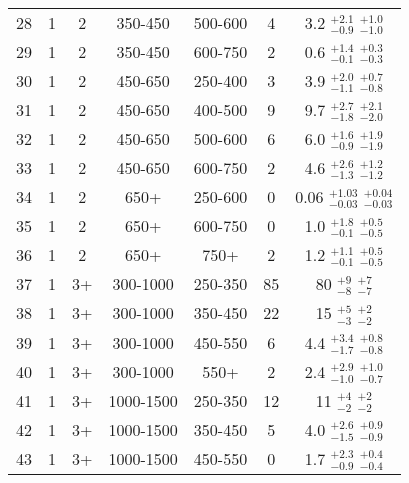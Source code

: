 \begin{table}[tbp]
{\begin{tabular}{ccccc  cc}
        28 &          1 &          2 &    350-450 &    500-600 &          4 &   3.2 $^{ +2.1} _{ -0.9}$ $^{ +1.0} _{ -1.0}$ \\
        29 &          1 &          2 &    350-450 &    600-750 &          2 &   0.6 $^{ +1.4} _{ -0.1}$ $^{ +0.3} _{ -0.3}$ \\
        30 &          1 &          2 &    450-650 &    250-400 &          3 &   3.9 $^{ +2.0} _{ -1.1}$ $^{ +0.7} _{ -0.8}$ \\
        31 &          1 &          2 &    450-650 &    400-500 &          9 &   9.7 $^{ +2.7} _{ -1.8}$ $^{ +2.1} _{ -2.0}$ \\
        32 &          1 &          2 &    450-650 &    500-600 &          6 &   6.0 $^{ +1.6} _{ -0.9}$ $^{ +1.9} _{ -1.9}$ \\
        33 &          1 &          2 &    450-650 &    600-750 &          2 &   4.6 $^{ +2.6} _{ -1.3}$ $^{ +1.2} _{ -1.2}$ \\
        34 &          1 &          2 &       650+ &    250-600 &          0 &  0.06 $^{+1.03} _{-0.03}$ $^{+0.04} _{-0.03}$ \\
        35 &          1 &          2 &       650+ &    600-750 &          0 &   1.0 $^{ +1.8} _{ -0.1}$ $^{ +0.5} _{ -0.5}$ \\
        36 &          1 &          2 &       650+ &       750+ &          2 &   1.2 $^{ +1.1} _{ -0.1}$ $^{ +0.5} _{ -0.5}$ \\
 \hline
        37 &          1 &         3+ &   300-1000 &    250-350 &         85 &    80 $^{   +9} _{   -8}$ $^{   +7} _{   -7}$ \\
        38 &          1 &         3+ &   300-1000 &    350-450 &         22 &    15 $^{   +5} _{   -3}$ $^{   +2} _{   -2}$ \\
        39 &          1 &         3+ &   300-1000 &    450-550 &          6 &   4.4 $^{ +3.4} _{ -1.7}$ $^{ +0.8} _{ -0.8}$ \\
        40 &          1 &         3+ &   300-1000 &       550+ &          2 &   2.4 $^{ +2.9} _{ -1.0}$ $^{ +1.0} _{ -0.7}$ \\
        41 &          1 &         3+ &  1000-1500 &    250-350 &         12 &    11 $^{   +4} _{   -2}$ $^{   +2} _{   -2}$ \\
        42 &          1 &         3+ &  1000-1500 &    350-450 &          5 &   4.0 $^{ +2.6} _{ -1.5}$ $^{ +0.9} _{ -0.9}$ \\
        43 &          1 &         3+ &  1000-1500 &    450-550 &          0 &   1.7 $^{ +2.3} _{ -0.9}$ $^{ +0.4} _{ -0.4}$ \\

\end{tabular}}
\end{table}
